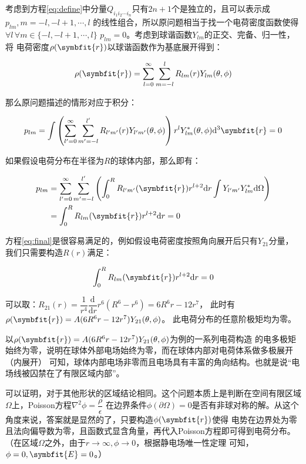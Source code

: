 \documentclass[11pt,a4paper]{ctexart}
\newcommand{\dd}{\mathrm{d}}
\begin{document}
考虑到方程\eqref{eq:define}中分量$Q_{i_1i_2\cdots i_n}$只有$2n+1$个是独立的，且可以表示成$p_{lm},m=-l,-l+1,\cdots,l$
的线性组合，所以原问题相当于找一个电荷密度函数使得$\forall l\,\forall m\in\{-l,-l+1,\cdots,l\}\,\,p_{lm}=0$。考虑到球谐函数$Y_{lm}$的正交、完备、归一性，将
电荷密度$\rho(\symbfit{r})$以球谐函数作为基底展开得到：

\begin{equation}
    \rho(\symbfit{r})=\sum_{l=0}^{\infty}\sum_{m=-l}^{l}R_{lm}(r)Y_{lm}(\theta,\phi)
\end{equation}

那么原问题描述的情形对应于积分：

\begin{equation}
    p_{lm}=\int\left(\sum_{l'=0}^{\infty}\sum_{m'=-l}^{l'}R_{l'm'}(r)Y_{l'm'}(\theta,\phi)\right)r^lY_{lm}^*(\theta,\phi)\dd^3\symbfit{r}=0
\end{equation}

如果假设电荷分布在半径为$R$的球体内部，那么即有：

\begin{align}
    p_{lm}&=\sum_{l'=0}^{\infty}\sum_{m'=-l}^{l'}\left(\int_{0}^{R} R_{l'm'}(\symbfit{r})r^{l+2}\dd r\int Y_{l'm'}Y_{lm}^*\dd\Omega\right) \notag \\
    &=\int_{0}^{R} R_{lm}(\symbfit{r})r^{l+2}\dd r=0
    \label{eq:final}
\end{align}

方程\eqref{eq:final}是很容易满足的，例如假设电荷密度按照角向展开后只有$Y_{21}$分量，我们只需要构造$R(r)$满足：

\begin{equation}
    \int_{0}^{R} R_{lm}(\symbfit{r})r^{l+2}\dd r=0
\end{equation}

可以取：$R_{21}(r)=\dfrac{1}{r^4}\dfrac{\dd}{\dd r}r^6(R^6-r^6)=6R^6r-12r^{7}$，
此时有$\rho(\symbfit{r})=A(6R^6r-12r^{7})Y_{21}(\theta,\phi)$。
此电荷分布的任意阶极矩均为零。

\bigskip

以$\rho(\symbfit{r})=A(6R^6r-12r^{7})Y_{21}(\theta,\phi)$为例的一系列电荷构造
的电多极矩始终为零，说明在球体外部电场始终为零，而在球体内部对电荷体系做多极展开（内展开）
可知，球体内部电场非零而且电场具有丰富的角向结构。也就是说“电场线被囚禁在了有限区域内部”。

可以证明，对于其他形状的区域结论相同。这个问题本质上是判断在空间有限区域$\Omega$上，Poisson方程$\nabla^2\phi=\dfrac{\rho}{\epsilon}$
在边界条件$\phi(\partial\Omega)=0$是否有非球对称的解。从这个角度来说，答案就是显然的了，只要构造$\phi(\symbfit{r})$使得
电势在边界处为零且法向偏导数为零，且函数式显含角量，再代入Poisson方程即可得到电荷分布。（在区域$\Omega$之外，由于$r\to \infty,\phi \to 0$，根据静电场唯一性定理
可知，$\phi=0,\symbfit{E}=0$。）
\end{document}
